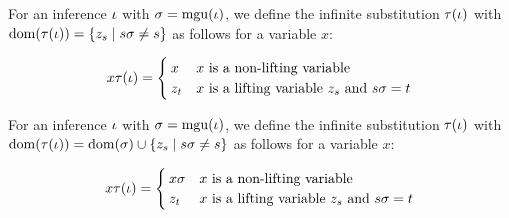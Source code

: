 \documentclass[,%
	draft=false,%
	numbers=noendperiod
	11pt,
	a4paper,
	oneside,%
	openany,
]{memoir}
\begin{document}
\tableofcontents

\clearpage

\begin{defi}
	For an inference $\iota$ with $\sigma = \operatorname{mgu}(\iota)$, we define the infinite substitution $\tau(\iota)$ with $\operatorname{dom}(\tau(\iota)) = \{z_s \mid s\sigma \neq s\}$ as follows for a variable $x$:

	\[
		x\tau(\iota) =
		\begin{cases}
			x & \text{$x$ is a non-lifting variable} \\
			z_t & \text{$x$ is a lifting variable $z_s$ and $s\sigma = t$}
		\end{cases}
	\]
\end{defi}

\begin{defi}
	For an inference $\iota$ with $\sigma = \operatorname{mgu}(\iota)$, we define the infinite substitution $\tau(\iota)$ with $\operatorname{dom}(\tau(\iota)) = \operatorname{dom}(\sigma) \cup \{z_s \mid s\sigma \neq s\}$ as follows for a variable $x$:

	\[
		x\tau(\iota) =
		\begin{cases}
			x\sigma & \text{$x$ is a non-lifting variable} \\
			z_t & \text{$x$ is a lifting variable $z_s$ and $s\sigma = t$}
		\end{cases}
	\]
\end{defi}
\end{document}
